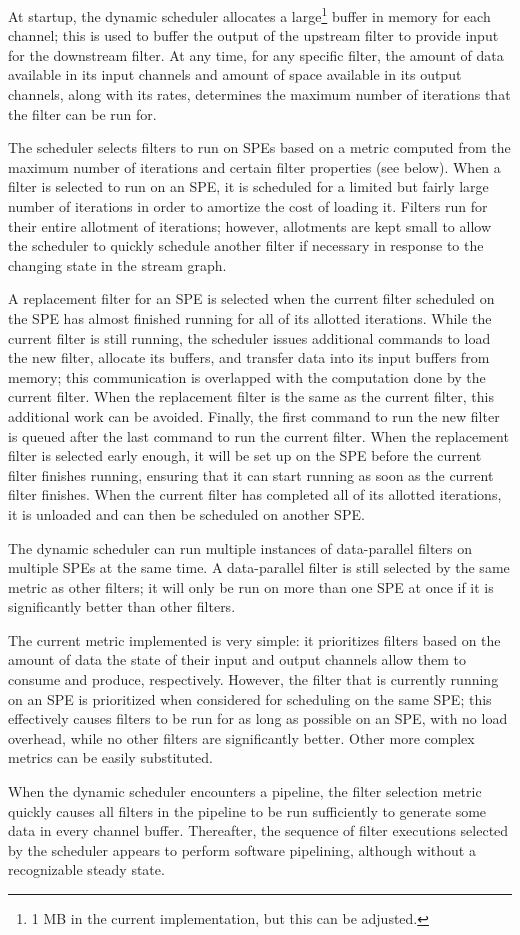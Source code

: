 At startup, the dynamic scheduler allocates a large\footnote{1 MB in the current implementation, but this can be adjusted.} buffer in memory for each channel; this is used to buffer the output of the upstream filter to provide input for the downstream filter. At any time, for any specific filter, the amount of data available in its input channels and amount of space available in its output channels, along with its rates, determines the maximum number of iterations that the filter can be run for.

The scheduler selects filters to run on SPEs based on a metric computed from the maximum number of iterations and certain filter properties (see below). When a filter is selected to run on an SPE, it is scheduled for a limited but fairly large number of iterations in order to amortize the cost of loading it. Filters run for their entire allotment of iterations; however, allotments are kept small to allow the scheduler to quickly schedule another filter if necessary in response to the changing state in the stream graph.

A replacement filter for an SPE is selected when the current filter scheduled on the SPE has almost finished running for all of its allotted iterations. While the current filter is still running, the scheduler issues additional commands to load the new filter, allocate its buffers, and transfer data into its input buffers from memory; this communication is overlapped with the computation done by the current filter. When the replacement filter is the same as the current filter, this additional work can be avoided. Finally, the first command to run the new filter is queued after the last command to run the current filter. When the replacement filter is selected early enough, it will be set up on the SPE before the current filter finishes running, ensuring that it can start running as soon as the current filter finishes. When the current filter has completed all of its allotted iterations, it is unloaded and can then be scheduled on another SPE.

The dynamic scheduler can run multiple instances of data-parallel filters on multiple SPEs at the same time. A data-parallel filter is still selected by the same metric as other filters; it will only be run on more than one SPE at once if it is significantly better than other filters.

The current metric implemented is very simple: it prioritizes filters based on the amount of data the state of their input and output channels allow them to consume and produce, respectively. However, the filter that is currently running on an SPE is prioritized when considered for scheduling on the same SPE; this effectively causes filters to be run for as long as possible on an SPE, with no load overhead, while no other filters are significantly better. Other more complex metrics can be easily substituted.

When the dynamic scheduler encounters a pipeline, the filter selection metric quickly causes all filters in the pipeline to be run sufficiently to generate some data in every channel buffer. Thereafter, the sequence of filter executions selected by the scheduler appears to perform software pipelining, although without a recognizable steady state.
